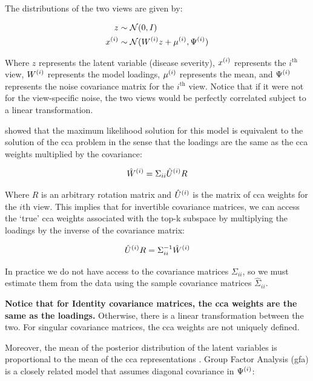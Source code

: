 The distributions of the two views are given by:

\begin{align}
    z& \sim \mathcal{N}(0, I)\\
    x^{(i)} & \sim \mathcal{N}(W^{(i)} z + \mu^{(i)}, \Psi^{(i)})
\end{align}

Where \(z\) represents the latent variable (disease severity), \(x^{(i)}\) represents the $i^{\text{th}}$ view, \(W^{(i)}\) represents the model loadings, \(\mu^{(i)}\) represents the mean, and \(\Psi^{(i)}\) represents the noise covariance matrix for the $i^{\text{th}}$ view.
Notice that if it were not for the view-specific noise, the two views would be perfectly correlated subject to a linear transformation.

\citet{bach2005probabilistic} showed that the maximum likelihood solution for this model is equivalent to the solution of the \acrshort{cca} problem in the sense that the \gls{loadings} are the same as the \acrshort{cca} weights multiplied by the covariance:

\begin{align}
    \label{eq:loadings-to-weights}
    \hat{W}^{(i)} = \Sigma_{ii} \hat{U}^{(i)} R
\end{align}

Where $R$ is an arbitrary rotation matrix and $\hat{U}^{(i)}$ is the matrix of \acrshort{cca} weights for the $i$th view.
This implies that for invertible covariance matrices, we can access the `true' \acrshort{cca} weights associated with the top-k subspace by multiplying the \gls{loadings} by the inverse of the covariance matrix:

\begin{align}
    \hat{U}^{(i)}R = \Sigma_{ii}^{-1} \hat{W}^{(i)}
\end{align}

In practice we do not have access to the covariance matrices $\Sigma_{ii}$, so we must estimate them from the data using the sample covariance matrices $\hat{\Sigma}_{ii}$.

\textbf{Notice that for Identity covariance matrices, the \acrshort{cca} weights are the same as the loadings.}
Otherwise, there is a linear transformation between the two.
For singular covariance matrices, the \acrshort{cca} weights are not uniquely defined.

Moreover, the mean of the posterior distribution of the latent variables is proportional to the mean of the \acrshort{cca} representations \citep{klami2013bayesian}.
Group Factor Analysis (\acrshort{gfa}) is a closely related model that assumes diagonal covariance in $\Psi^{(i)}$:

